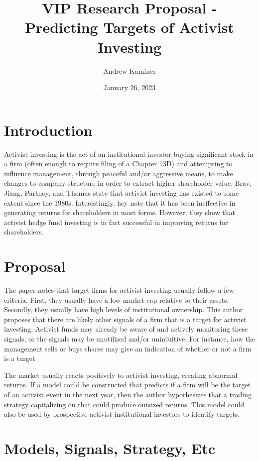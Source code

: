 \documentclass[11pt,a4paper]{article}
\title{VIP Research Proposal - Predicting Targets of Activist Investing}
\author{Andrew Kaminer}
\date{January 26, 2023}
\begin{document}
\maketitle

\thispagestyle{empty}

\section{Introduction}

Activist investing is the act of an institutional investor buying significant
stock in a firm (often enough to require filing of a Chapter 13D) and attempting
to influence management, through peaceful and/or aggressive means, to make 
changes to company structure in order to extract higher shareholder value.
Brav, Jiang, Partnoy, and Thomas\cite{BravEtAll} state that activist investing
has existed to some extent since the 1980s. Interestingly, hey note that it has 
been ineffective in generating returns for shareholders in most forms. 
However, they show that activist hedge fund investing is in fact successful in 
improving returns for shareholders.

\section{Proposal}

The paper notes that target firms for activist investing usually follow a few
criteria. First, they usually have a low market cap relative to their assets.
Secondly, they usually have high levels of institutional ownership. This author
proposes that there are likely other signals of a firm that is a target for 
activist investing. Activist funds may already be aware of and actively 
monitoring these signals, or the signals may be unutilized and/or unintuitive.
For instance, how the management sells or buys shares may give an indication 
of whether or not a firm is a target

The market usually reacts positively to activist investing, creating abnormal
returns.\cite{BravEtAll} If a model could be constructed that predicts if a 
firm will be the target of an activist event in the next year, then the author
hypothesizes that a trading strategy capitalizing on that could produce outsized
returns. This model could also be used by prospective activist institutional
investors to identify targets.

\section{Models, Signals, Strategy, Etc}
\end{document}

